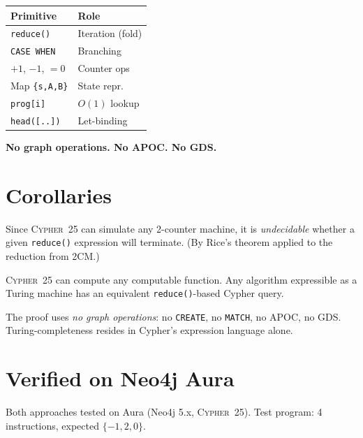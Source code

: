 \documentclass[9pt,a4paper,twocolumn]{article}
\begin{document}
{\small
\begin{tabular}{@{}lp{3.8cm}@{}}
\toprule
\textbf{Primitive} & \textbf{Role} \\
\midrule
\texttt{reduce()} & Iteration (fold) \\
\texttt{CASE WHEN} & Branching \\
$+1$, $-1$, $=0$ & Counter ops \\
Map \texttt{\{s,A,B\}} & State repr. \\
\texttt{prog[i]} & $O(1)$ lookup \\
\texttt{head([..])} & Let-binding \\
\bottomrule
\end{tabular}}

\smallskip
\textbf{No graph operations. No APOC. No GDS.}

\section{Corollaries}

\begin{sfact}
Since \textsc{Cypher~25} can simulate any 2-counter machine, it is
\emph{undecidable} whether a given \texttt{reduce()} expression
will terminate.
(By Rice's theorem applied to the reduction from 2CM.)
\end{sfact}

\begin{sfact}
\textsc{Cypher~25} can compute any computable function.
Any algorithm expressible as a Turing machine has an equivalent
\texttt{reduce()}-based Cypher query.
\end{sfact}

\begin{sfact}
The proof uses \emph{no graph operations}: no \texttt{CREATE}, no
\texttt{MATCH}, no APOC, no GDS. Turing-completeness resides in
Cypher's expression language alone.
\end{sfact}

\section{Verified on Neo4j Aura}

Both approaches tested on Aura (Neo4j 5.x, \textsc{Cypher~25}). Test program: 4 instructions, expected $\{-1, 2, 0\}$.
\end{document}
